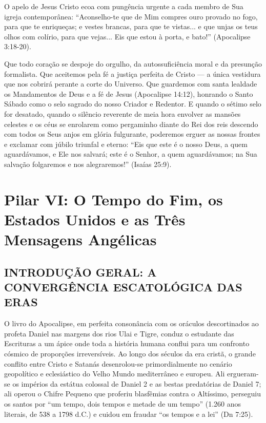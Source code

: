 \documentclass[11pt,a4paper,openany]{book}
\begin{document}
O apelo de Jesus Cristo ecoa com pungência urgente a cada membro de Sua igreja contemporânea:
``Aconselho-te que de Mim compres ouro provado no fogo, para que te enriqueças; e vestes brancas, para que te vistas... e que unjas os teus olhos com colírio, para que vejas... Eis que estou à porta, e bato!'' (Apocalipse 3:18-20).

Que todo coração se despoje do orgulho, da autossuficiência moral e da presunção formalista. Que aceitemos pela fé a justiça perfeita de Cristo — a única vestidura que nos cobrirá perante a corte do Universo. Que guardemos com santa lealdade os Mandamentos de Deus e a fé de Jesus (Apocalipse 14:12), honrando o Santo Sábado como o selo sagrado do nosso Criador e Redentor.
E quando o sétimo selo for desatado, quando o silêncio reverente de meia hora envolver as mansões celestes e os céus se enrolarem como pergaminho diante do Rei dos reis descendo com todos os Seus anjos em glória fulgurante, poderemos erguer as nossas frontes e exclamar com júbilo triunfal e eterno:
``Eis que este é o nosso Deus, a quem aguardávamos, e Ele nos salvará; este é o Senhor, a quem aguardávamos; na Sua salvação folgaremos e nos alegraremos!'' (Isaías 25:9).
\chapter{Pilar VI: O Tempo do Fim, os Estados Unidos e as Três Mensagens Angélicas}




\section{INTRODUÇÃO GERAL: A CONVERGÊNCIA ESCATOLÓGICA DAS ERAS}


O livro do Apocalipse, em perfeita consonância com os oráculos descortinados ao profeta Daniel nas margens dos rios Ulai e Tigre, conduz o estudante das Escrituras a um ápice onde toda a história humana conflui para um confronto cósmico de proporções irreversíveis. Ao longo dos séculos da era cristã, o grande conflito entre Cristo e Satanás desenrolou-se primordialmente no cenário geopolítico e eclesiástico do Velho Mundo mediterrâneo e europeu. Ali ergueram-se os impérios da estátua colossal de Daniel 2 e as bestas predatórias de Daniel 7; ali operou o Chifre Pequeno que proferiu blasfêmias contra o Altíssimo, perseguiu os santos por ``um tempo, dois tempos e metade de um tempo'' (1.260 anos literais, de 538 a 1798 d.C.) e cuidou em fraudar ``os tempos e a lei'' (Dn 7:25).
\end{document}
